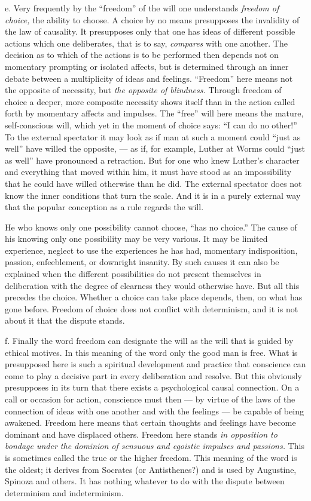 \documentclass[12pt,a4paper,openany]{book}
\newcommand{\opage}[1]{\marginnote{\footnotesize\textit{[#1]}}}
\begin{document}
e. Very frequently by the ``freedom'' of the will one understands \textit{freedom of choice,} the ability
to choose. A choice by no means presupposes the invalidity of the law of causality. It presupposes only
that one has ideas of different possible actions which one deliberates, that is to say,
\textit{compares} with one another. The decision as to which of the actions is to be performed then
depends not on momentary prompting or isolated affects, but is determined through an inner debate between
a multiplicity of ideas and feelings. ``Freedom'' here means not the opposite of necessity, but
\textit{the opposite of blindness.} Through freedom of choice a deeper, more composite necessity shows
itself than in the action called forth by momentary affects and impulses. The ``free'' will here means
the mature, self-conscious will, which yet in the moment of choice says: ``I can do no other!'' To the
external spectator it may look as if man at such a moment could ``just as well'' have willed the
opposite, --- as if, for example, Luther at Worms could ``just as well'' have pronounced a retraction.
But for one who knew Luther's character and everything that moved within him, it must have stood as an
impossibility that he could have willed otherwise than he did. The external spectator does not know the
inner conditions that turn the scale. And it is in a purely external way that the popular conception as a
rule regards the will.

He who knows only one possibility cannot choose, ``has no choice.'' The cause of his knowing only one
possibility may be very various. It may be limited experience, neglect to use the experiences he has had,
momentary indisposition, passion, enfeeblement, or downright insanity. By such causes it can also be
explained when the different possibilities do not present themselves in deliberation with the degree of
clearness they would otherwise have. But all this precedes the choice. Whether a choice can take place
depends, then, on what has gone before. Freedom of choice does not conflict with determinism, and it is
not about it that the dispute stands.

f. Finally the word freedom can designate the will as the will that
\opage{111}is guided by ethical motives. In this meaning of the word only the good man is free. What is
presupposed here is such a spiritual development and practice that conscience can come to play a
decisive part in every deliberation and resolve. But this obviously presupposes in its turn that there
exists a psychological causal connection. On a call or occasion for action, conscience must then --- by
virtue of the laws of the connection of ideas with one another and with the feelings --- be capable of
being awakened. Freedom here means that certain thoughts and feelings have become dominant and have
displaced others. Freedom here stands \textit{in opposition to bondage under the dominion of sensuous and
egoistic impulses and passions.} This is sometimes called the true or the higher freedom. This meaning of
the word is the oldest; it derives from Socrates (or Antisthenes?) and is used by Augustine, Spinoza and
others. It has nothing whatever to do with the dispute between determinism and indeterminism.
\end{document}
